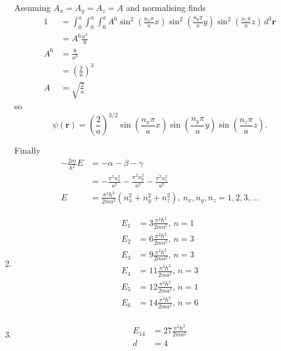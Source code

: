 \documentclass{article}
\renewcommand{\vec}[1]{\boldsymbol{\mathbf{#1}}}
\begin{document}
\begin{enumerate}
        Assuming $A_x = A_y = A_z = A$ and normalising finds \begin{align*}
          1   & = \int_0^a \int_0^a \int_0^a A^6 \sin^2 \left( \frac{n_x \pi}{a} x \right) \sin^2 \left( \frac{n_y \pi}{a} y \right) \sin^2 \left( \frac{n_z \pi}{a} z \right) \,d^3 \vec{r} \\
              & = A^6 \frac{a^3}{8}                                                                                                                                                          \\
          A^6 & = \frac{8}{a^3}                                                                                                                                                              \\
              & = \left( \frac{2}{a} \right)^3                                                                                                                                               \\
          A   & = \sqrt{\frac{2}{a}}
        \end{align*} so \[\psi(\vec{r}) = \left( \frac{2}{a} \right)^{3 / 2} \sin \left( \frac{n_x \pi}{a} x \right) \sin \left( \frac{n_y \pi}{a} y \right) \sin \left( \frac{n_z \pi}{a} z \right).\]

        Finally \begin{align*}
          -\frac{2 m}{\hbar^2} E & = -\alpha - \beta - \gamma                                                                 \\
                                 & = -\frac{\pi^2 n_x^2}{a^2} - \frac{\pi^2 n_y^2}{a^2} - \frac{\pi^2 n_z^2}{a^2}             \\
          E                      & = \frac{\pi^2 \hbar^2}{2 m a^2} (n_x^2 + n_y^2 + n_z^2), \,n_x, n_y, n_z = 1, 2, 3, \ldots
        \end{align*}

  \item

  \begin{align*}
    E_1 &= 3 \frac{\pi^2 \hbar^2}{2 m a^2}, \,n = 1 \\
    E_2 &= 6 \frac{\pi^2 \hbar^2}{2 m a^2}, \,n = 3 \\
    E_3 &= 9 \frac{\pi^2 \hbar^2}{2 m a^2}, \,n = 3 \\
    E_4 &= 11 \frac{\pi^2 \hbar^2}{2 m a^2}, \,n = 3 \\
    E_5 &= 12 \frac{\pi^2 \hbar^2}{2 m a^2}, \,n = 1 \\
    E_6 &= 14 \frac{\pi^2 \hbar^2}{2 m a^2}, \,n = 6 \\
  \end{align*}

  \item

  \begin{align*}
    E_{14} &= 27 \frac{\pi^2 \hbar^2}{2 m a^2} \\
    d &= 4
  \end{align*}
\end{enumerate}
\end{document}
